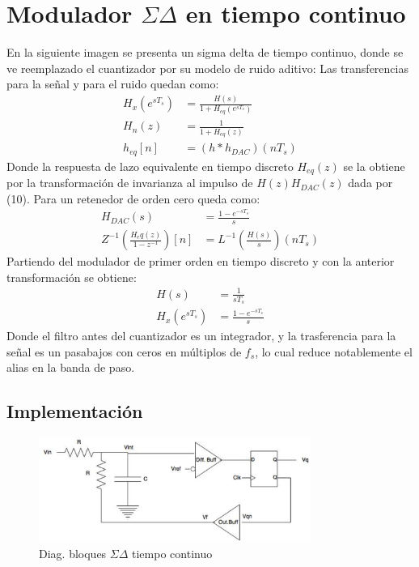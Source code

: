 \documentclass[a4paper,conference]{IEEEtran}
\begin{document}
\section{Modulador $\Sigma\Delta$ en tiempo continuo}
En la siguiente imagen se presenta un sigma delta de tiempo continuo, donde se ve reemplazado el cuantizador por su modelo de ruido aditivo:
Las transferencias para la se\~nal y para el ruido quedan como:
\begin{align}
H_x(e^{sT_s}) &= \frac{H(s)}{1+H_{eq}(e^{sT_s})} \\
H_n(z) &= \frac{1}{1+H_{eq}(z)} \\
h_{eq}[n] &= (h\ast h_{DAC})(nT_s)
\end{align}
Donde la respuesta de lazo equivalente en tiempo discreto $H_{eq}(z)$ se la obtiene por la transformaci\'on de invarianza al impulso \cite{DSP:Pro-Man} de $H(z)H_{DAC}(z)$ dada por (10). Para un retenedor de orden cero queda como:
\begin{align}
 H_{DAC}(s)&=\frac{1-e^{-sT_s}}{s}\\
 Z^{-1}(\frac{H_eq(z)}{1-z^{-1}})[n]&=L^{-1}(\frac{H(s)}{s})(nT_s)
\end{align}
Partiendo del modulador de primer orden en tiempo discreto y con la anterior transformaci\'on se obtiene:
\begin{align}
 H(s)&=\frac{1}{sT_s}\\
 H_x(e^{sT_s})&= \frac{1-e^{-sT_s}}{s}
\end{align}
Donde el filtro antes del cuantizador es un integrador, y la trasferencia para la se\~nal es un pasabajos con ceros en múltiplos de $f_s$, lo cual reduce notablemente el alias en la banda de paso.
\subsection{Implementaci\'on}

\begin{figure}[!t]
\centering
\includegraphics[width=3.5in]{Sigma-Delta_Tiempo_Continuo}
\caption{Diag. bloques $\Sigma\Delta$ tiempo continuo}
\label{fig_4}
\end{figure}
\end{document}
